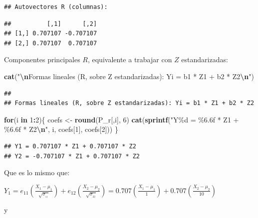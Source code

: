 \documentclass[
]{book}
\newenvironment{Shaded}{\begin{snugshade}}{\end{snugshade}}
\newcommand{\ControlFlowTok}[1]{\textcolor[rgb]{0.13,0.29,0.53}{\textbf{#1}}}
\newcommand{\DecValTok}[1]{\textcolor[rgb]{0.00,0.00,0.81}{#1}}
\newcommand{\FunctionTok}[1]{\textcolor[rgb]{0.13,0.29,0.53}{\textbf{#1}}}
\newcommand{\NormalTok}[1]{#1}
\newcommand{\OtherTok}[1]{\textcolor[rgb]{0.56,0.35,0.01}{#1}}
\newcommand{\SpecialCharTok}[1]{\textcolor[rgb]{0.81,0.36,0.00}{\textbf{#1}}}
\newcommand{\StringTok}[1]{\textcolor[rgb]{0.31,0.60,0.02}{#1}}
\begin{document}
\begin{verbatim}
## Autovectores R (columnas):
\end{verbatim}

\begin{verbatim}
##          [,1]      [,2]
## [1,] 0.707107 -0.707107
## [2,] 0.707107  0.707107
\end{verbatim}

Componentes principales \(R\), equivalente a trabajar con \(Z\) estandarizadas:

\begin{Shaded}
\begin{Highlighting}[]
\FunctionTok{cat}\NormalTok{(}\StringTok{"}\SpecialCharTok{\textbackslash{}n}\StringTok{Formas lineales (R, sobre Z estandarizadas): Yi = b1 * Z1 + b2 * Z2}\SpecialCharTok{\textbackslash{}n}\StringTok{"}\NormalTok{)}
\end{Highlighting}
\end{Shaded}

\begin{verbatim}
## 
## Formas lineales (R, sobre Z estandarizadas): Yi = b1 * Z1 + b2 * Z2
\end{verbatim}

\begin{Shaded}
\begin{Highlighting}[]
\ControlFlowTok{for}\NormalTok{(i }\ControlFlowTok{in} \DecValTok{1}\SpecialCharTok{:}\DecValTok{2}\NormalTok{)\{}
\NormalTok{  coefs }\OtherTok{\textless{}{-}} \FunctionTok{round}\NormalTok{(P\_r[,i], }\DecValTok{6}\NormalTok{)}
  \FunctionTok{cat}\NormalTok{(}\FunctionTok{sprintf}\NormalTok{(}\StringTok{"Y\%d = \%6.6f * Z1 + \%6.6f * Z2}\SpecialCharTok{\textbackslash{}n}\StringTok{"}\NormalTok{, i, coefs[}\DecValTok{1}\NormalTok{], coefs[}\DecValTok{2}\NormalTok{]))}
\NormalTok{\}}
\end{Highlighting}
\end{Shaded}

\begin{verbatim}
## Y1 = 0.707107 * Z1 + 0.707107 * Z2
## Y2 = -0.707107 * Z1 + 0.707107 * Z2
\end{verbatim}

Que es lo mismo que:

\(Y_1 = e_{11}\left( \frac{X_1-\mu_1}{\sqrt{\sigma_{_{11}}}} \right) + e_{12}\left( \frac{X_2-\mu_2}{\sqrt{\sigma_{_{22}}}} \right) = 0.707\left( \frac{X_1-\mu_1}{1} \right) + 0.707\left( \frac{X_2-\mu_2}{10} \right)\)

y
\end{document}
